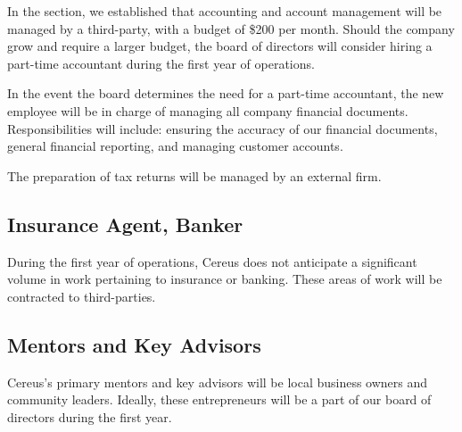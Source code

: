 In the  section, we established that accounting and account management will be managed by a third-party, with a budget of \$200 per month. Should the company grow and require a larger budget, the board of directors will consider hiring a part-time accountant during the first year of operations.

In the event the board determines the need for a part-time accountant, the new employee will be in charge of managing all company financial documents. Responsibilities will include: ensuring the accuracy of our financial documents, general financial reporting, and managing customer accounts.

The preparation of tax returns will be managed by an external firm.

\subsection{Insurance Agent, Banker}

During the first year of operations, Cereus does not anticipate a significant volume in work pertaining to insurance or banking. These areas of work will be contracted to third-parties.

\subsection{Mentors and Key Advisors}

Cereus's primary mentors and key advisors will be local business owners and community leaders. Ideally, these entrepreneurs will be a part of our board of directors during the first year.